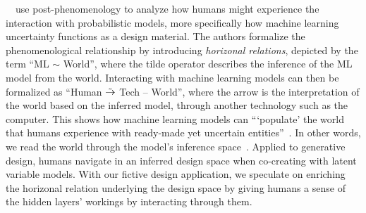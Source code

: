 \documentclass[manuscript]{acmart}
\begin{document}
\citeauthor{benjamin_machine_2021}~\cite{benjamin_machine_2021}~use post-phenomenology to analyze how humans might experience the interaction with probabilistic models, more specifically
how machine learning uncertainty functions as a design material. The authors formalize the phenomenological relationship by introducing \textit{horizonal relations}, depicted by the term ``ML $\sim$ World'', where the tilde operator describes the inference of the ML model from the world.
Interacting with machine learning models can then be formalized as ``Human $\Tilde{\rightarrow}$ Tech -- World'', 
where the arrow is the interpretation of the world based on the inferred model, through another technology such as the computer.
This shows how machine learning models can ```populate' the world that humans experience with ready-made yet uncertain entities''~\cite[p.12]{benjamin_machine_2021}. In other words, we read the world through the model's inference space~\cite{benjamin_machine_2021}. 
Applied to generative design, humans navigate in an inferred design space when co-creating with latent variable models.
With our fictive design application, we speculate on enriching the horizonal relation underlying the design space by
giving humans a sense of the hidden layers' workings by interacting through them.

\end{document}
